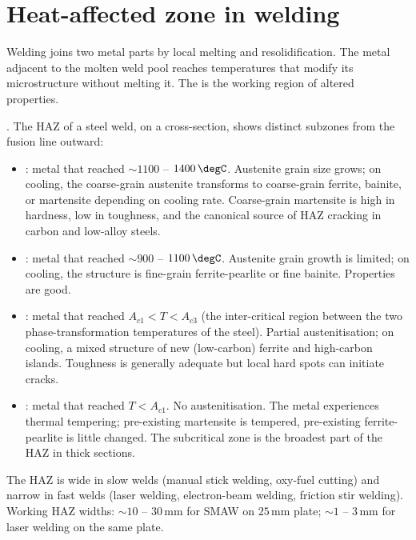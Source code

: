 \section{Heat-affected zone in welding}

Welding joins two metal parts by local melting and resolidification.
The metal adjacent to the molten weld pool reaches temperatures that
modify its microstructure without melting it. The  is the working region of altered properties.

. The HAZ
of a steel weld, on a cross-section, shows distinct subzones from
the fusion line outward:

\begin{itemize}[leftmargin=*]
\item {}: metal that reached $\sim 1100$ -- $1400\,
  \degC$. Austenite grain size grows; on cooling, the coarse-grain
  austenite transforms to coarse-grain ferrite, bainite, or martensite
  depending on cooling rate. Coarse-grain martensite is high in
  hardness, low in toughness, and the canonical source of HAZ
  cracking in carbon and low-alloy steels.
\item {}: metal that reached $\sim 900$ -- $1100\,
  \degC$. Austenite grain growth is limited; on cooling, the structure
  is fine-grain ferrite-pearlite or fine bainite. Properties are good.
\item {}: metal that reached $A_{c1} < T <
  A_{c3}$ (the inter-critical region between the two phase-transformation
  temperatures of the steel). Partial austenitisation; on cooling,
  a mixed structure of new (low-carbon) ferrite and high-carbon
  islands. Toughness is generally adequate but local hard spots can
  initiate cracks.
\item {}: metal that reached $T < A_{c1}$.
  No austenitisation. The metal experiences thermal tempering;
  pre-existing martensite is tempered, pre-existing ferrite-pearlite
  is little changed. The subcritical zone is the broadest part of
  the HAZ in thick sections.
\end{itemize}

The HAZ is wide in slow welds (manual stick welding, oxy-fuel cutting)
and narrow in fast welds (laser welding, electron-beam welding, friction
stir welding). Working HAZ widths: $\sim 10$ -- $30\,\text{mm}$ for
SMAW on $25\,\text{mm}$ plate; $\sim 1$ -- $3\,\text{mm}$ for laser
welding on the same plate.

